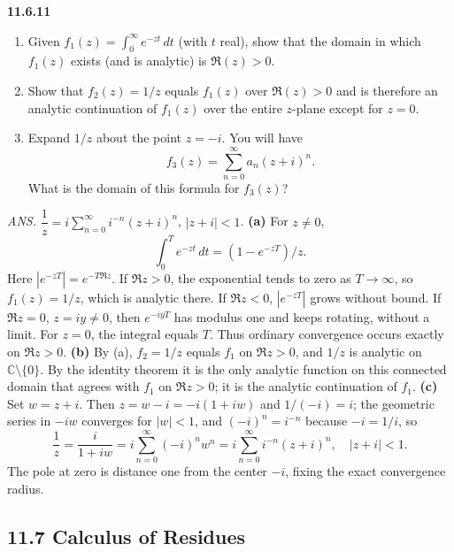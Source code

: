 \par\bigskip
\noindent\textbf{11.6.11}\quad
\begin{enumerate}
\item[(a)] Given $f_{1}(z)=\displaystyle\int_{0}^{\infty}e^{-zt}\,dt$ (with
  $t$ real), show that the domain in which $f_{1}(z)$ exists (and is
  analytic) is $\Re(z)>0$.
\item[(b)] Show that $f_{2}(z)=1/z$ equals $f_{1}(z)$ over $\Re(z)>0$ and is
  therefore an analytic continuation of $f_{1}(z)$ over the entire $z$-plane
  except for $z=0$.
\item[(c)] Expand $1/z$ about the point $z=-i$. You will have
  \[
  f_{3}(z)=\sum_{n=0}^{\infty}a_{n}(z+i)^{n}.
  \]
  What is the domain of this formula for $f_{3}(z)$?
\end{enumerate}
\par\nobreak\hfill\emph{ANS.}\enspace
$\dfrac{1}{z}=i\displaystyle\sum_{n=0}^{\infty}i^{-n}(z+i)^{n}$,\quad
$|z+i| < 1$.
\solution
\textbf{(a)} For $z\ne0$,
\[
\int_0^Te^{-zt}\,dt=(1-e^{-zT})/z.
\]
Here $|e^{-zT}|=e^{-T\Re z}$. If $\Re z>0$, the exponential tends to
zero as $T\to\infty$, so $f_1(z)=1/z$, which is analytic there.
If $\Re z<0$, $|e^{-zT}|$ grows without bound. If $\Re z=0$,
$z=iy\ne0$, then $e^{-iyT}$ has modulus one and keeps rotating, without
a limit. For $z=0$, the integral equals $T$.
Thus ordinary convergence occurs exactly on $\Re z>0$.
\textbf{(b)} By (a), $f_2=1/z$ equals $f_1$ on $\Re z>0$, and $1/z$ is
analytic on $\mathbb C\setminus\{0\}$. By the identity theorem it is
the only analytic function on this connected domain that agrees with
$f_1$ on $\Re z>0$; it is the analytic continuation of $f_1$.
\textbf{(c)} Set $w=z+i$. Then $z=w-i=-i(1+iw)$ and $1/(-i)=i$; the
geometric series in $-iw$ converges for $|w|<1$, and
$(-i)^n=i^{-n}$ because $-i=1/i$, so
\[
\boxed{\frac1z=\frac i{1+iw}
=i\sum_{n=0}^\infty(-i)^nw^n
=i\sum_{n=0}^\infty i^{-n}(z+i)^n,\quad |z+i|<1}.
\]
The pole at zero is distance one from the center $-i$, fixing
the exact convergence radius.

\subsection*{11.7 Calculus of Residues}

